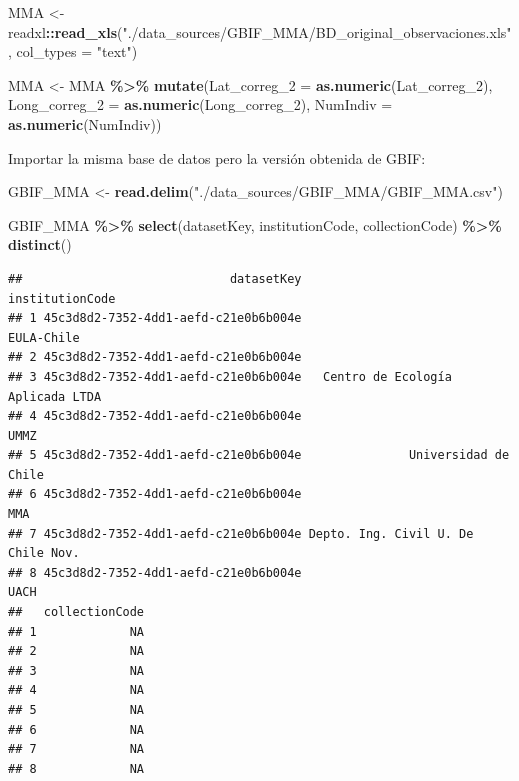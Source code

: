 \documentclass[sn-apa,pdflatex]{sn-jnl}
\newenvironment{Shaded}{\begin{snugshade}}{\end{snugshade}}
\newcommand{\AttributeTok}[1]{\textcolor[rgb]{0.13,0.29,0.53}{#1}}
\newcommand{\FunctionTok}[1]{\textcolor[rgb]{0.13,0.29,0.53}{\textbf{#1}}}
\newcommand{\NormalTok}[1]{#1}
\newcommand{\OtherTok}[1]{\textcolor[rgb]{0.56,0.35,0.01}{#1}}
\newcommand{\SpecialCharTok}[1]{\textcolor[rgb]{0.81,0.36,0.00}{\textbf{#1}}}
\newcommand{\StringTok}[1]{\textcolor[rgb]{0.31,0.60,0.02}{#1}}
\begin{document}
\begin{Shaded}
\begin{Highlighting}[]
\NormalTok{MMA }\OtherTok{\textless{}{-}}\NormalTok{ readxl}\SpecialCharTok{::}\FunctionTok{read\_xls}\NormalTok{(}\StringTok{"./data\_sources/GBIF\_MMA/BD\_original\_observaciones.xls"}\NormalTok{,}
    \AttributeTok{col\_types =} \StringTok{"text"}\NormalTok{)}

\NormalTok{MMA }\OtherTok{\textless{}{-}}\NormalTok{ MMA }\SpecialCharTok{\%\textgreater{}\%}
    \FunctionTok{mutate}\NormalTok{(}\AttributeTok{Lat\_correg\_2 =} \FunctionTok{as.numeric}\NormalTok{(Lat\_correg\_2), }\AttributeTok{Long\_correg\_2 =} \FunctionTok{as.numeric}\NormalTok{(Long\_correg\_2),}
        \AttributeTok{NumIndiv =} \FunctionTok{as.numeric}\NormalTok{(NumIndiv))}
\end{Highlighting}
\end{Shaded}

Importar la misma base de datos pero la versión obtenida de GBIF:

\begin{Shaded}
\begin{Highlighting}[]
\NormalTok{GBIF\_MMA }\OtherTok{\textless{}{-}} \FunctionTok{read.delim}\NormalTok{(}\StringTok{"./data\_sources/GBIF\_MMA/GBIF\_MMA.csv"}\NormalTok{)}


\NormalTok{GBIF\_MMA }\SpecialCharTok{\%\textgreater{}\%}
    \FunctionTok{select}\NormalTok{(datasetKey, institutionCode, collectionCode) }\SpecialCharTok{\%\textgreater{}\%}
    \FunctionTok{distinct}\NormalTok{()}
\end{Highlighting}
\end{Shaded}

\begin{verbatim}
##                             datasetKey                    institutionCode
## 1 45c3d8d2-7352-4dd1-aefd-c21e0b6b004e                         EULA-Chile
## 2 45c3d8d2-7352-4dd1-aefd-c21e0b6b004e                                   
## 3 45c3d8d2-7352-4dd1-aefd-c21e0b6b004e   Centro de Ecología Aplicada LTDA
## 4 45c3d8d2-7352-4dd1-aefd-c21e0b6b004e                               UMMZ
## 5 45c3d8d2-7352-4dd1-aefd-c21e0b6b004e               Universidad de Chile
## 6 45c3d8d2-7352-4dd1-aefd-c21e0b6b004e                                MMA
## 7 45c3d8d2-7352-4dd1-aefd-c21e0b6b004e Depto. Ing. Civil U. De Chile Nov.
## 8 45c3d8d2-7352-4dd1-aefd-c21e0b6b004e                               UACH
##   collectionCode
## 1             NA
## 2             NA
## 3             NA
## 4             NA
## 5             NA
## 6             NA
## 7             NA
## 8             NA
\end{verbatim}
\end{document}
